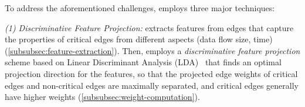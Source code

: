 
To address the aforementioned challenges, \tool employs three major
techniques:

\emph{(1) Discriminative Feature Projection:} 
\tool extracts features from edges that capture the properties of critical edges from different aspects (\eg data flow size, time) (\cref{subsubsec:feature-extraction}).
Then, \tool employs a \emph{discriminative feature projection} scheme based on Linear Discriminant Analysis (LDA)~\cite{Mika99fisherdiscriminant} that finds an optimal projection direction for the features, so that the projected edge weights of critical edges and non-critical edges are maximally separated, and critical edges generally have higher weights (\cref{subsubsec:weight-computation}).





